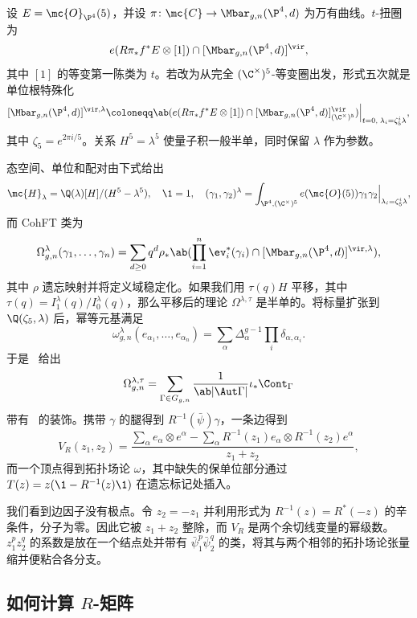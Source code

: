 设 \(E = \mc{O}_{\P^4}(5)\)，并设 \(\pi \colon \mc{C} \to \Mbar_{g,n}(\P^4,d)\) 为万有曲线。\(t\)-扭圈为
\[ e(R\pi_* f^* E \otimes [1]) \cap [\Mbar_{g,n}(\P^4,d)]^{\vir}, \]
其中 \([1]\) 的等变第一陈类为 \(t\)。若改为从完全 \((\C^{\times})^5\)-等变圈出发，形式五次就是单位根特殊化
\[ [\Mbar_{g,n}(\P^4,d)]^{\vir,\lambda} \coloneqq \ab( e(R\pi_*f^*E \otimes [1]) \cap [\Mbar_{g,n}(\P^4,d)]^{\vir}_{(\C^{\times})^5})\Big|_{t=0, \; \lambda_i = \zeta_5^i \lambda}, \]
其中 \(\zeta_5 = e^{2\pi i/5}\)。关系 \(H^5 = \lambda^5\) 使量子积一般半单，同时保留 \(\lambda\) 作为参数。

态空间、单位和配对由下式给出
\[ \mc{H}_{\lambda} = \Q(\lambda)[H]/(H^5-\lambda^5), \quad \1 = 1, \quad (\gamma_1,\gamma_2)^{\lambda} = \int_{\P^4, (\C^{\times})^5} e(\mc{O}(5))\gamma_1\gamma_2 \Big|_{\lambda_i = \zeta_5^i\lambda}, \]
而 CohFT 类为
\[ \Omega^{\lambda}_{g,n}(\gamma_1, \ldots, \gamma_n) = \sum_{d \geq 0} q^d \rho_* \ab( \prod_{i=1}^n \ev_i^*(\gamma_i) \cap [\Mbar_{g,n}(\P^4,d)]^{\vir,\lambda}), \]
其中 \(\rho\) 遗忘映射并将定义域稳定化。如果我们用 \(\tau(q)H\) 平移，其中 \(\tau(q) = I^{\lambda}_1(q)/I^{\lambda}_0(q)\)，那么平移后的理论 \(\Omega^{\lambda,\tau}\) 是半单的。将标量扩张到 \(\Q(\zeta_5,\lambda)\) 后，幂等元基满足
\[ \omega^{\lambda}_{g,n}(e_{\alpha_1}, \ldots, e_{\alpha_n}) = \sum_{\alpha}\Delta_{\alpha}^{g-1}\prod_i \delta_{\alpha,\alpha_i}. \]
于是~ 给出
\[ \Omega^{\lambda,\tau}_{g,n} = \sum_{\Gamma \in G_{g,n}} \frac{1}{\ab|\Aut\Gamma|}\iota_* \Cont_{\Gamma} \]
带有~ 的装饰。携带 \(\gamma\) 的腿得到 \(R^{-1}(\bar{\psi})\gamma\)，一条边得到
\[ V_R(z_1,z_2) = \frac{\sum_{\alpha} e_{\alpha}\otimes e^{\alpha} - \sum_{\alpha} R^{-1}(z_1)e_{\alpha} \otimes R^{-1}(z_2)e^{\alpha}}{z_1+z_2}, \]
而一个顶点得到拓扑场论 \(\omega\)，其中缺失的保单位部分通过 \(T(z) = z(\1 - R^{-1}(z)\1)\) 在遗忘标记处插入。

\begin{rmk}
    我们看到边因子没有极点。令 \(z_2 = -z_1\) 并利用形式为 \(R^{-1}(z) = R^*(-z)\) 的辛条件，分子为零。因此它被 \(z_1+z_2\) 整除，而 \(V_R\) 是两个余切线变量的幂级数。\(z_1^p z_2^q\) 的系数是放在一个结点处并带有 \(\bar{\psi}_1^p \bar{\psi}_2^q\) 的类，将其与两个相邻的拓扑场论张量缩并便粘合各分支。
\end{rmk}

\subsection{如何计算 \(R\)-矩阵}%
\label{sub:How to compute the R-matrix (Guo)}

